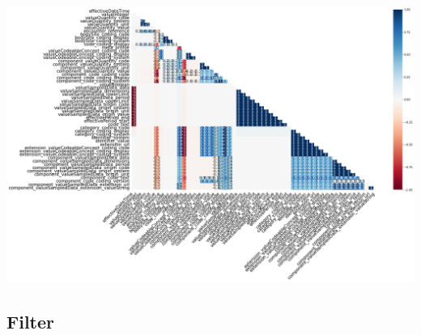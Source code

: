 \documentclass[11pt, oneside]{article}
\begin{document}
\begin{center}
\includegraphics[scale=0.25]{2_msn_heatmap.png}
\end{center}

\subsection{Filter}
\end{document}
